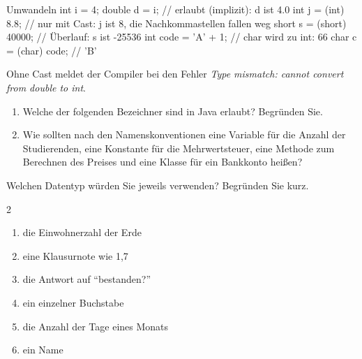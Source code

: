 \begin{javacode}[Ausschnitt]{Umwandeln}
int i = 4;
double d = i;               // erlaubt (implizit): d ist 4.0
int j = (int) 8.8;          // nur mit Cast: j ist 8, die Nachkommastellen fallen weg
short s = (short) 40000;    // Überlauf: s ist -25536
int code = 'A' + 1;         // char wird zu int: 66
char c = (char) code;       // 'B'
\end{javacode}
Ohne Cast meldet der Compiler bei  den Fehler \emph{Type mismatch: cannot convert from double to int}.

\aufgaben
{}
\begin{enumerate}[label=\alph*)]
\item Welche der folgenden Bezeichner sind in Java erlaubt? Begründen Sie. \\
 \quad {} \quad {} \quad {} \quad {} \quad {} \quad {} \quad {}
\item Wie sollten nach den Namenskonventionen eine Variable für die Anzahl der Studierenden, eine Konstante für die Mehrwertsteuer, eine Methode zum Berechnen des Preises und eine Klasse für ein Bankkonto heißen?
\end{enumerate}

Welchen Datentyp würden Sie jeweils verwenden? Begründen Sie kurz.
\begin{multicols}{2}
\begin{enumerate}[label=\alph*)]
\item die Einwohnerzahl der Erde
\item eine Klausurnote wie 1,7
\item die Antwort auf \enquote{bestanden?}
\item ein einzelner Buchstabe
\item die Anzahl der Tage eines Monats
\item ein Name
\end{enumerate}
\end{multicols}

